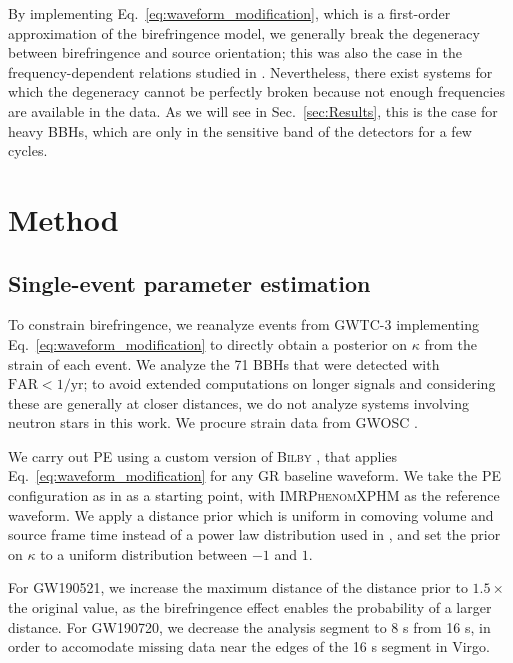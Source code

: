 \documentclass[aps,prd,twocolumn,superscriptaddress,preprintnumbers,floatfix,nofootinbib]{revtex4-2}
\begin{document}
By implementing Eq.~\eqref{eq:waveform_modification}, which is a first-order approximation of the birefringence model, we generally break the degeneracy between birefringence and source orientation; this was also the case in the frequency-dependent relations studied in \cite{Yamada_2020,Wang_2021}.
Nevertheless, there exist systems for which the degeneracy cannot be perfectly broken because not enough frequencies are available in the data.
As we will see in Sec.~\ref{sec:Results}, this is the case for heavy \acp{BBH}, which are only in the sensitive band of the detectors for a few cycles.


\section{Method}
\label{sec:Method}

\subsection{Single-event parameter estimation}

To constrain birefringence, we reanalyze events from GWTC-3 \citep{GWTC-2.1, GWTC-3} implementing Eq.~\eqref{eq:waveform_modification} to directly obtain a posterior on $\kappa$ from the strain of each event.
We analyze the 71 \acp{BBH} that were detected with $\mathrm{FAR} < 1/\mathrm{yr}$; to avoid extended computations on longer signals and considering these are generally at closer distances, we do not analyze systems involving neutron stars in this work.
We procure strain data from \ac{GWOSC} \citep{GWOSC}.

We carry out \ac{PE} using a custom version of \textsc{Bilby} \citep{Bilby}, that applies Eq.~\eqref{eq:waveform_modification} for any \ac{GR} baseline waveform.
We take the \ac{PE} configuration as in \citep{GWTC-2.1, GWTC-3, GWTC-2.1_dataset, GWTC-3_dataset} as a starting point, with \textsc{IMRPhenomXPHM} \citep{Pratten:2020ceb} as the reference waveform.
We apply a distance prior which is uniform in comoving volume and source frame time instead of a power law distribution used in \citep{GWTC-2.1, GWTC-3, GWTC-2.1_dataset, GWTC-3_dataset}, and set the prior on $\kappa$ to a uniform distribution between $-1$ and $1$.

For GW190521, we increase the maximum distance of the distance prior to $1.5\times$ the original value, as the birefringence effect enables the probability of a larger distance.
For GW190720, we decrease the analysis segment to 8 s from 16 s, in order to accomodate missing data near the edges of the 16 s segment in Virgo.
\end{document}
